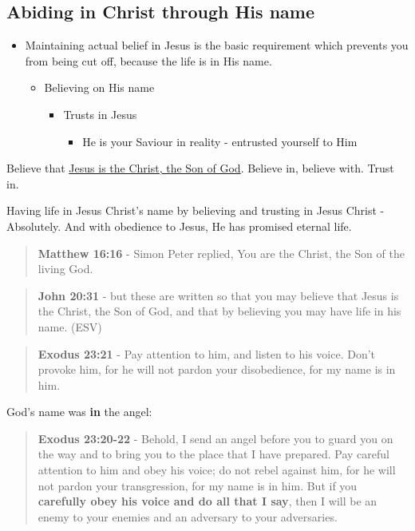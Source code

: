 \documentclass[11pt]{article}
\begin{document}
\subsection{Abiding in Christ through His name}
\label{sec:org8746071}
\begin{itemize}
\item Maintaining actual belief in Jesus is the basic requirement which prevents you from being cut off, because the life is in His name.
\begin{itemize}
\item Believing on His name
\begin{itemize}
\item Trusts in Jesus
\begin{itemize}
\item He is your Saviour in reality - entrusted yourself to Him
\end{itemize}
\end{itemize}
\end{itemize}
\end{itemize}

Believe that \uline{Jesus is the Christ, the Son of God}. Believe in, believe with. Trust in.

Having life in Jesus Christ's name by believing and trusting in Jesus Christ - Absolutely.
And with obedience to Jesus, He has promised eternal life.

\begin{quote}
\textbf{Matthew 16:16} - Simon Peter replied, You are the Christ, the Son of the living God.
\end{quote}

\begin{quote}
\textbf{John 20:31} - but these are written so that you may believe that Jesus is the Christ, the Son of God, and that by believing you may have life in his name. (ESV)
\end{quote}

\begin{quote}
\textbf{Exodus 23:21} - Pay attention to him, and listen to his voice. Don't provoke him, for he will not pardon your disobedience, for my name is in him.
\end{quote}

God's name was \textbf{in} the angel:

\begin{quote}
\textbf{Exodus 23:20-22} - Behold, I send an angel before you to guard you on the way and to bring you to the place that I have prepared. Pay careful attention to him and obey his voice; do not rebel against him, for he will not pardon your transgression, for my name is in him. But if you \textbf{carefully obey his voice and do all that I say}, then I will be an enemy to your enemies and an adversary to your adversaries.
\end{quote}
\end{document}
